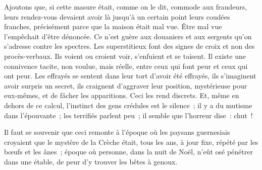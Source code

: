 \documentclass[french,twoside]{book} %
\begin{document}
Ajoutons que, si cette masure était, comme on le dit, commode aux fraudeurs, leurs rendez-vous devaient avoir là jusqu’à un certain point leurs coudées  franches, précisément parce que la maison était mal vue. Être mal vue l’empêchait d’être dénoncée. Ce n’est guère aux douaniers et aux sergents qu’on s’adresse contre les spectres. Les superstitieux font des signes de croix et non des procès-verbaux. Ils voient ou croient voir, s’enfuient et se taisent. Il existe une connivence tacite, non voulue, mais réelle, entre ceux qui font peur et ceux qui ont peur. Les effrayés se sentent dans leur tort d’avoir été effrayés, ils s’imaginent avoir surpris un secret, ils craignent d’aggraver leur position, mystérieuse pour eux-mêmes, et de fâcher les apparitions. Ceci les rend discrets. Et, même en dehors de ce calcul, l’instinct des gens crédules est le silence ; il y a du mutisme dans l’épouvante ; les terrifiés parlent peu ; il semble que l’horreur dise : chut !\par
Il faut se souvenir que ceci remonte à l’époque où les paysans guernesiais croyaient que le mystère de la Crèche était, tous les ans, à jour fixe, répété par les bœufs et les ânes ; époque où personne, dans la nuit de Noël, n’eût osé pénétrer dans une étable, de peur d’y trouver les bêtes à genoux.\par
\end{document}
